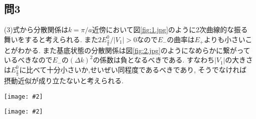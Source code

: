 \documentclass[uplatex,a4j,11pt,dvipdfmx]{jsarticle}
\makeatletter
\def\fgcaption{\def\@captype{figure}\caption}
\newcommand{\mfig}[3][width=15cm]{
\begin{center}
\texttt{[image: \#2]}
\fgcaption{#3 \label{fig:#2}}
\end{center}
}
\makeatother
\begin{document}
\subsection*{問3}
(3)式から分散関係は$k=\pi/a$近傍において図\ref{fig:1.jpg}のように2次曲線的な振る舞いをすると考えられる.
また$2E_{\frac{\pi}{a}}^0/|V_1|>0$なので$E_{-}$の曲率は$E_{+}$よりも小さいことがわかる.
また基底状態の分散関係は図\ref{fig:2.jpg}のようになめらかに繋がっているべきなので$E_{-}$の$(\Delta k)^2$の係数は負となるべきである.
すなわち$|V_1|$の大きさは$E_{\frac{\pi}{a}}^0$に比べて十分小さいか,せいぜい同程度であるべきであり,
そうでなければ摂動近似が成り立たないと考えられる.
\mfig[width=6cm]{1.jpg}{$k=\pi/a$近傍での振る舞い}
\mfig[width=6cm]{2.jpg}{基底状態の分散関係}
\end{document}

